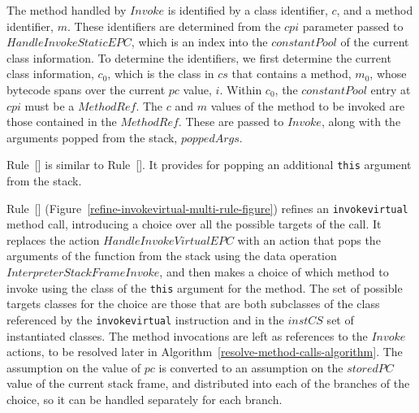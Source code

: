 The method handled by $Invoke$ is identified by a class identifier,
$c$, and a method identifier, $m$.
These identifiers are determined from the $cpi$ parameter passed to
$HandleInvokeStaticEPC$, which is an index into the $constantPool$ of
the current class information.
To determine the identifiers, we first determine the current class
information, $c_0$, which is the class in $cs$ that contains a method,
$m_0$, whose bytecode spans over the current $pc$ value, $i$.
Within $c_0$, the $constantPool$ entry at $cpi$ must be a $MethodRef$.
The $c$ and $m$ values of the method to be invoked are those contained
in the $MethodRef$.
These are passed to $Invoke$, along with the arguments popped from the
stack, $poppedArgs$.

Rule~[] is similar to
Rule~[].
It provides for popping an additional \texttt{this} argument from the
stack.

Rule~[]
(Figure~\ref{refine-invokevirtual-multi-rule-figure}) refines an
\texttt{invokevirtual} method call, introducing a choice over all the
possible targets of the call.
It replaces the action $HandleInvokeVirtualEPC$ with an action that
pops the arguments of the function from the stack using the data
operation $InterpreterStackFrameInvoke$, and then makes a choice of
which method to invoke using the class of the \texttt{this} argument
for the method.
The set of possible targets classes for the choice are those that are
both subclasses of the class referenced by the \texttt{invokevirtual}
instruction and in the $instCS$ set of instantiated classes.
The method invocations are left as references to the $Invoke$ actions,
to be resolved later in
Algorithm~\ref{resolve-method-calls-algorithm}.
The assumption on the value of $pc$ is converted to an assumption on
the $storedPC$ value of the current stack frame, and distributed into
each of the branches of the choice, so it can be handled separately
for each branch.


